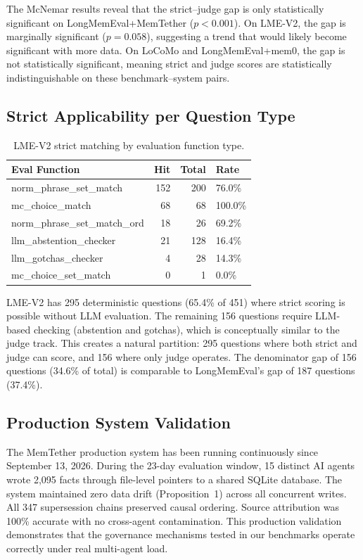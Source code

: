 \documentclass[10pt]{article}
\begin{document}
The McNemar results reveal that the strict--judge gap is only statistically significant on LongMemEval+MemTether ($p < 0.001$). On LME-V2, the gap is marginally significant ($p = 0.058$), suggesting a trend that would likely become significant with more data. On LoCoMo and LongMemEval+mem0, the gap is not statistically significant, meaning strict and judge scores are statistically indistinguishable on these benchmark--system pairs.

\subsection{Strict Applicability per Question Type}
\begin{table}[h]
\centering
\caption{LME-V2 strict matching by evaluation function type.}
\label{tab:lmev2types}
\begin{tabular}{lrrl}
\toprule
Eval Function & Hit & Total & Rate \\
\midrule
norm\_phrase\_set\_match & 152 & 200 & 76.0\% \\
mc\_choice\_match & 68 & 68 & 100.0\% \\
norm\_phrase\_set\_match\_ord & 18 & 26 & 69.2\% \\
llm\_abstention\_checker & 21 & 128 & 16.4\% \\
llm\_gotchas\_checker & 4 & 28 & 14.3\% \\
mc\_choice\_set\_match & 0 & 1 & 0.0\% \\
\bottomrule
\end{tabular}
\end{table}

LME-V2 has 295 deterministic questions (65.4\% of 451) where strict scoring is possible without LLM evaluation. The remaining 156 questions require LLM-based checking (abstention and gotchas), which is conceptually similar to the judge track. This creates a natural partition: 295 questions where both strict and judge can score, and 156 where only judge operates. The denominator gap of 156 questions (34.6\% of total) is comparable to LongMemEval's gap of 187 questions (37.4\%).

\subsection{Production System Validation}
The MemTether production system has been running continuously since September 13, 2026. During the 23-day evaluation window, 15 distinct AI agents wrote 2{,}095 facts through file-level pointers to a shared SQLite database. The system maintained zero data drift (Proposition~1) across all concurrent writes. All 347 supersession chains preserved causal ordering. Source attribution was 100\% accurate with no cross-agent contamination. This production validation demonstrates that the governance mechanisms tested in our benchmarks operate correctly under real multi-agent load.
\end{document}
